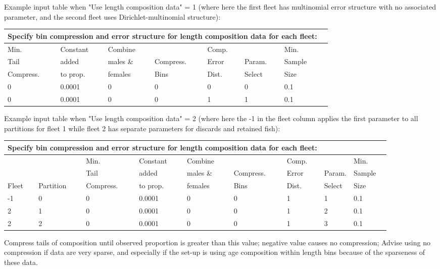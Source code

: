 Example input table when "Use length composition data" = 1 (where here the first fleet has multinomial error structure with no associated parameter, and the second fleet uses Dirichlet-multinomial structure):
\begin{tabular}{p{2cm} p{2cm} p{2cm} p{2cm} p{2cm} p{2cm} p{2cm} p{1.7cm}}
	\multicolumn{7}{l}{Specify bin compression and error structure for length composition data for each fleet:}\\
	\hline
	Min.      & Constant & Combine   &           & Comp. &           & Min.\Tstrut\\
	Tail      & added    & males \&  & Compress. & Error & Param.    & Sample\\
	Compress. & to prop. & females   & Bins      & Dist. & Select    & Size\Bstrut\\
	\hline
	0 & 0.0001 & 0 & 0 & 0 & 0 & 0.1 \Tstrut\\
	0 & 0.0001 & 0 & 0 & 1 & 1 & 0.1 \Bstrut\\
	\hline
\end{tabular}

Example input table when "Use length composition data" = 2 (where here the -1 in the fleet column applies the first parameter to all partitions for fleet 1 while fleet 2 has separate parameters for discards and retained fish):
\begin{tabular}{p{2cm} p{2cm} p{2cm} p{2cm} p{2cm} p{2cm} p{2cm} p{2cm} p{2cm} p{1.7cm}}
		\multicolumn{7}{l}{Specify bin compression and error structure for length composition data for each fleet:}\\
		\hline
		          &           & Min.      & Constant & Combine   &           & Comp. &           & Min.\Tstrut\\
		          &           & Tail      & added    & males \&  & Compress. & Error & Param.    & Sample\\
		Fleet     & Partition & Compress. & to prop. & females   & Bins      & Dist. & Select    & Size\Bstrut\\
		\hline
		-1 & 0 & 0 & 0.0001 & 0 & 0 & 1 & 1 & 0.1 \Tstrut\\
		2 & 1 & 0 & 0.0001 & 0 & 0 & 1 & 2 & 0.1 \\
		2 & 2 & 0 & 0.0001 & 0 & 0 & 1 & 3 & 0.1 \Bstrut\\
		\hline
\end{tabular}


Compress tails of composition until observed proportion is greater than this value; negative value causes no compression; Advise using no compression if data are very sparse, and especially if the set-up is using age composition within length bins because of the sparseness of these data.

